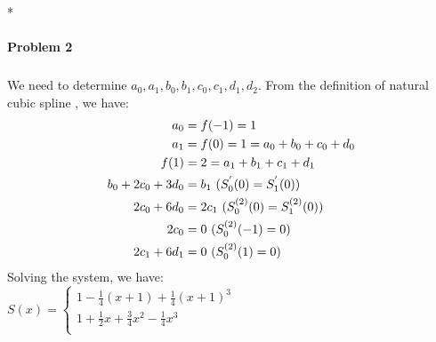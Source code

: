 *\documentclass{article}
\begin{document}
\paragraph{Problem 2}
\subparagraph{} We need to determine $a_0, a_1, b_0, b_1, c_0, c_1, d_1, d_2$. From the definition of natural cubic spline , we have:
\begin{equation}\nonumber
\begin{split}
a_0 &= f(-1) = 1 \\
a_1 &= f(0) = 1 = a_0 + b_0 + c_0 + d_0 \\
f(1) &= 2 = a_1 + b_1 + c_1 + d_1 \\
b_0+2c_0+3d_0 &= b_1\ (S_0^{\rq}(0)=S_1^{\rq}(0))\\
2c_0+6d_0 &= 2c_1\ (S_0^{(2)}(0)=S_1^{(2)}(0))\\ 
2c_0 &= 0\ (S_0^{(2)}(-1) = 0) \\
2c_1+6d_1 &= 0\ (S_0^{(2)}(1) = 0)
\end{split}
\end{equation}
Solving the system, we have: \\
$S(x)=
\begin{cases}
               1 - \frac{1}{4}(x+1) + \frac{1}{4}(x+1)^3 \\
               1 + \frac{1}{2}x + \frac{3}{4}x^2 - \frac{1}{4}x^3 \\
\end{cases}$\\~\\~\\

\newpage
\end{document}
